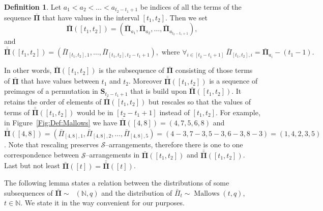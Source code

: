 \documentclass[letterpaper,11pt]{article}
\theoremstyle{definition}
\newtheorem{definition}[theorem]{Definition}
\theoremstyle{remark}
\DeclareMathOperator{\Mallow}{Mallows}
\DeclareMathOperator{\Mallows}{Mallows_{seq}}
\newcommand{\bS}{\mathbf{S}}
\newcommand{\barpi}{\bar \varPi}
\newcommand{\barPi}{\bar {\mathbf \Pi}}
\newcommand{\barbarPi}{{\bar{\bar {\mathbf \Pi}}}}
\newcommand{\NN}{\mathbb{N}}
\newcommand{\cS}{\mathcal{S}}
\begin{document}
\begin{definition}\label{Def:barPi:Obraz}
	Let    $a_1<a_2<\ldots<a_{t_2-t_1+1}$ be indices of all the terms of the sequence $\barPi$ that have values in the interval $[t_1,t_2]$. Then we set
	\begin{equation*}
		\barPi([t_1,t_2])=
		(\barPi_{a_1},\barPi_{a_2},\ldots,\barPi_{a_{t_2-t_1+1}}),
	\end{equation*}	
	and 
	\begin{equation*}
		\barbarPi([t_1,t_2])=(\barpi_{[t_1,t_2],1},\ldots,\barpi_{[t_1,t_2],t_2-t_1+1}),\text{ where }\forall_{i\in [t_2-t_1+1]}\ \barpi_{[t_1,t_2],i}=\barPi_{a_i}-(t_1-1). 
	\end{equation*}	
\end{definition}
In other words, $\barPi([t_1,t_2])$ is the subsequence of $\barPi$ consisting of those terms of $\barPi$ that have values between $t_1$ and $t_2$. Moreover $\barbarPi([t_1,t_2])$ is a sequence of preimages of a permutation in $\bS_{t_2-t_1+1}$ that is build upon $\barPi([t_1,t_2])$. It retains the order of elements of $\barPi([t_1,t_2])$ but rescales so that the values of terms of $\barbarPi([t_1,t_2])$ would be in $[t_2-t_1+1]$ instead of $[t_1,t_2]$. For example, in Figure~\ref{Fig:Def:Mallows} we have $\barPi([4,8])=(4,7,5,6,8)$ and 
$\barbarPi([4,8])=(\barpi_{[4,8],1},\barpi_{[4,8],2},\ldots,\barpi_{[4,8],5})=(4-3,7-3,5-3,6-3,8-3)=(1,4,2,3,5)$. Note that rescaling preserves $\cS$--arrangements, therefore there is one to one correspondence between $\cS$--arrangements in $\barPi([t_1,t_2])$ and $\barbarPi([t_1,t_2])$. Last but not least $\barPi([t])=\barbarPi([t])$.



















The following lemma states a relation between the distributions of some subsequences of $\barPi\sim \Mallows(\NN,q)$ and the distribution of $\barpi_t\sim\Mallow(t,q)$, $t\in\NN$. We state it in the way convenient for our purposes.
\end{document}

